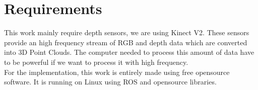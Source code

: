 \section{Requirements}

This work mainly require depth sensors, we are using Kinect V2. These sensors provide an high frequency stream of RGB and depth data which are converted into 3D Point Clouds. The computer needed to process this amount of data have to be powerful if we want to process it with high frequency. \\
For the implementation, this work is entirely made using free opensource software. It is running on Linux using ROS and opensource libraries.